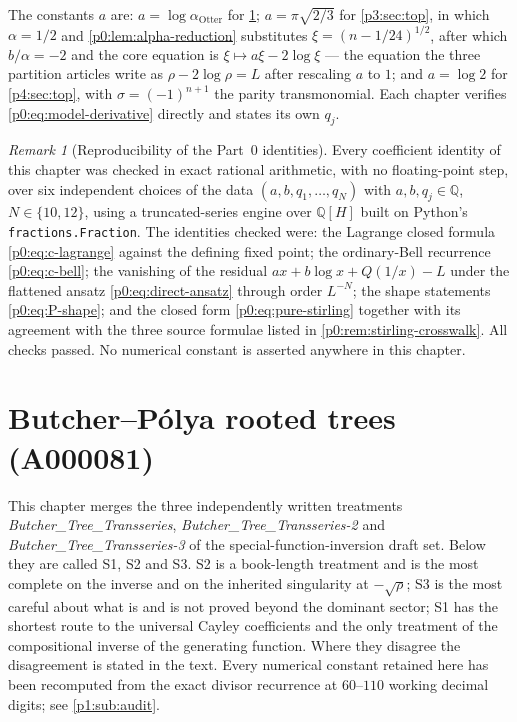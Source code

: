 \documentclass[11pt,a4paper,oneside]{book}
\theoremstyle{plain}
\theoremstyle{definition}
\theoremstyle{remark}
\newtheorem{remark}[theorem]{Remark}
\newcommand{\Rat}{\mathbb{Q}}
\begin{document}
The constants $a$ are: $a=\log\alpha_{\mathrm{Otter}}$ for
\cref{p1:sec:top}; $a=\pi\sqrt{2/3}$ for \cref{p3:sec:top}, in which
$\alpha=1/2$ and \cref{p0:lem:alpha-reduction} substitutes
$\xi=(n-1/24)^{1/2}$, after which $b/\alpha=-2$ and the core equation is
$\xi\mapsto a\xi-2\log\xi$ --- the equation the three partition articles write
as $\rho-2\log\rho=L$ after rescaling $a$ to $1$; and $a=\log2$ for
\cref{p4:sec:top}, with $\sigma=(-1)^{n+1}$ the parity transmonomial.  Each
chapter verifies \eqref{p0:eq:model-derivative} directly and states its own
$q_j$.

\begin{remark}[Reproducibility of the Part~0 identities]\label{p0:rem:verification}
Every coefficient identity of this chapter was checked in exact rational
arithmetic, with no floating-point step, over six independent choices of the
data $(a,b,q_1,\dots,q_N)$ with $a,b,q_j\in\Rat$, $N\in\{10,12\}$, using a
truncated-series engine over $\Rat[H]$ built on Python's
\texttt{fractions.Fraction}.  The identities checked were:
the Lagrange closed formula \eqref{p0:eq:c-lagrange} against the defining
fixed point; the ordinary-Bell recurrence \eqref{p0:eq:c-bell}; the vanishing
of the residual $ax+b\log x+Q(1/x)-L$ under the flattened ansatz
\eqref{p0:eq:direct-ansatz} through order $L^{-N}$; the shape statements
\eqref{p0:eq:P-shape}; and the closed form
\eqref{p0:eq:pure-stirling} together with its agreement with the three source
formulae listed in \cref{p0:rem:stirling-crosswalk}.  All checks passed.  No
numerical constant is asserted anywhere in this chapter.
\end{remark}

\chapter{Butcher--P\'olya rooted trees (A000081)}
\label{p1:sec:top}

\begin{sourcebox}
This chapter merges the three independently written treatments
\emph{Butcher\_Tree\_Transseries}, \emph{Butcher\_Tree\_Transseries-2} and
\emph{Butcher\_Tree\_Transseries-3} of the special-function-inversion draft set. Below they
are called \textsf{S1}, \textsf{S2} and \textsf{S3}. \textsf{S2} is a book-length treatment
and is the most complete on the inverse and on the inherited singularity at $-\sqrt\rho$;
\textsf{S3} is the most careful about what is and is not proved beyond the dominant sector;
\textsf{S1} has the shortest route to the universal Cayley coefficients and the only treatment
of the compositional inverse of the generating function. Where they disagree the disagreement
is stated in the text.  Every numerical constant retained here has been recomputed from the
exact divisor recurrence at $60$--$110$ working decimal digits; see \cref{p1:sub:audit}.
\end{sourcebox}
\end{document}
